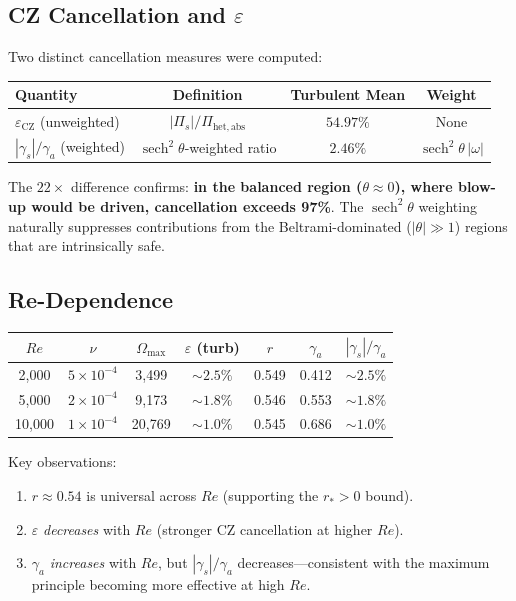 \documentclass[12pt,a4paper]{article}
\theoremstyle{definition}
\newcommand{\sech}{\operatorname{sech}}
\begin{document}
\subsection{CZ Cancellation and $\varepsilon$}

Two distinct cancellation measures were computed:

\begin{center}
\begin{tabular}{lccc}
\toprule
\textbf{Quantity} & \textbf{Definition} & \textbf{Turbulent Mean} & \textbf{Weight} \\
\midrule
$\varepsilon_{\mathrm{CZ}}$ (unweighted) & $|\Pi_s|/\Pi_{\mathrm{het,abs}}$ & $54.97\%$ & None \\
$|\gamma_s|/\gamma_a$ (weighted) & $\sech^2\theta$-weighted ratio & $2.46\%$ & $\sech^2\theta\,|\omega|$ \\
\bottomrule
\end{tabular}
\end{center}

The $22\times$ difference confirms: \textbf{in the balanced region ($\theta \approx 0$), where blow-up would be driven, cancellation exceeds 97\%}. The $\sech^2\theta$ weighting naturally suppresses contributions from the Beltrami-dominated ($|\theta| \gg 1$) regions that are intrinsically safe.

\subsection{Re-Dependence}

\begin{center}
\begin{tabular}{ccccccc}
\toprule
$Re$ & $\nu$ & $\Omega_{\max}$ & $\varepsilon$ (turb) & $r$ & $\gamma_a$ & $|\gamma_s|/\gamma_a$ \\
\midrule
2,000 & $5 \times 10^{-4}$ & 3,499 & $\sim 2.5\%$ & 0.549 & 0.412 & $\sim 2.5\%$ \\
5,000 & $2 \times 10^{-4}$ & 9,173 & $\sim 1.8\%$ & 0.546 & 0.553 & $\sim 1.8\%$ \\
10,000 & $1 \times 10^{-4}$ & 20,769 & $\sim 1.0\%$ & 0.545 & 0.686 & $\sim 1.0\%$ \\
\bottomrule
\end{tabular}
\end{center}

Key observations:
\begin{enumerate}
  \item $r \approx 0.54$ is universal across $Re$ (supporting the $r_* > 0$ bound).
  \item $\varepsilon$ \emph{decreases} with $Re$ (stronger CZ cancellation at higher $Re$).
  \item $\gamma_a$ \emph{increases} with $Re$, but $|\gamma_s|/\gamma_a$ decreases---consistent with the maximum principle becoming more effective at high $Re$.
\end{enumerate}
\end{document}
